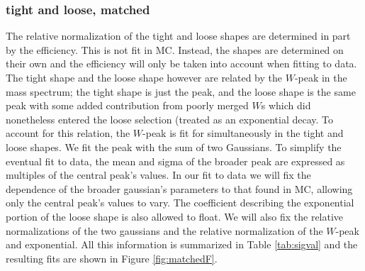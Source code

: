 \subsubsection*{tight and loose, matched}
The relative normalization of the tight and loose shapes are determined in part by the efficiency. This is not fit in MC. Instead, the shapes are determined on their own and the efficiency will only be taken into account when fitting to data. The tight shape and the loose shape however are related by the $W$-peak in the mass spectrum; the tight shape is just the peak, and the loose shape is the same peak with some added contribution from poorly merged $W$s which did nonetheless entered the loose selection (treated as an exponential decay. To account for this relation, the $W$-peak is fit for simultaneously in the tight and loose shapes. We fit the peak with the sum of two Gaussians. To simplify the eventual fit to data, the mean and sigma of the broader peak are expressed as multiples of the central peak's values. In our fit to data we will fix the dependence of the broader gaussian's parameters to that found in MC, allowing only the central peak's values to vary. The coefficient describing the exponential portion of the loose shape is also allowed to float. We will also fix the relative normalizations of the two gaussians and the relative normalization of the $W$-peak and exponential. All this information is summarized in Table \ref{tab:sigval} and the resulting fits are shown in Figure \ref{fig:matchedF}.

